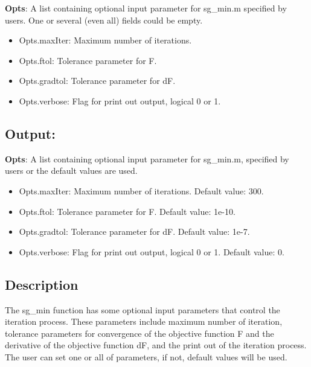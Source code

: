 \documentclass[a4paper,11pt,openany]{memoir}
\begin{document}
\begin{par}
\textbf{Opts}: A list containing optional input parameter for sg\_min.m specified by users.  One or several (even all) fields could be empty.
\end{par} \vspace{1em}
\begin{itemize}
\setlength{\itemsep}{-1ex}
   \item Opts.maxIter: Maximum number of iterations.
   \item Opts.ftol: Tolerance parameter for F.
   \item Opts.gradtol: Tolerance parameter for dF.
   \item Opts.verbose: Flag for print out output, logical 0 or 1.
\end{itemize}


\subsection*{Output:}

\begin{par}
\textbf{Opts}: A list containing optional input parameter for sg\_min.m, specified by users or the default values are used.
\end{par} \vspace{1em}
\begin{itemize}
\setlength{\itemsep}{-1ex}
   \item Opts.maxIter: Maximum number of iterations.  Default value: 300.
   \item Opts.ftol: Tolerance parameter for F.  Default value: 1e-10.
   \item Opts.gradtol: Tolerance parameter for dF.  Default value: 1e-7.
   \item Opts.verbose: Flag for print out output, logical 0 or 1. Default value: 0.
\end{itemize}


\subsection*{Description}

\begin{par}
The sg\_min function has some optional input parameters that control the iteration process.  These parameters include maximum number of iteration, tolerance parameters for convergence of the objective function F and the derivative of the objective function dF, and the print out of the iteration process.  The user can set one or all of parameters, if not, default values will be used.
\end{par} \vspace{1em}
\end{document}
